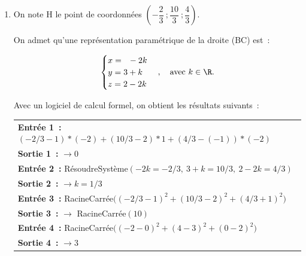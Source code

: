 \begin{enumerate}
\begin{enumerate}[label=\textbf{\alph*.}]
		\item La valeur exacte de la longueur DE, distance du point D au plan (ABC) est: 
		
$\begin{aligned}
\text{DE}
& =\ds\sqrt{\left (x_{\text E} - x_{\text D}\right )^2 + \left (y_{\text E} - y_{\text D}\right )^2 + \left (z_{\text E} - z_{\text D}\right )^2}
 =\ds\sqrt{\left (\frac{11}{2} - 8\right )^2 + \left (-2 - 2\right )^2 + \left (-\frac{21}{2} - (-11)\right )^2}\\
 & = \ds\sqrt{\left (-\frac{5}{2}\right )^2 + \left (-4\right )^2 + \left (\frac{1}{2}\right )^2}
 = \ds\sqrt{\frac{25}{4} + 16 + \frac{1}{4} }
  = \ds\sqrt{\frac{90}{4}}
  = \dfrac{3\sqrt{10}}{2}
\end{aligned}$		
		
		  
	\end{enumerate}
\item On note H le point de coordonnées $\left(-\dfrac{2}{3}~;\dfrac{10}{3}~;\dfrac{4}{3}\right)$.

On admet qu'une représentation paramétrique de la droite (BC) est~:

\[
\begin{cases}
x = \phantom{3}-2k\\
y = 3+k\\
z = 2-2k
\end{cases}, \quad \text{avec } k \in \R.
\]

Avec un logiciel de calcul formel, on obtient les résultats suivants~:

\begin{center}
\begin{tabular}{|p{8.5cm}|}\hline
\textbf{Entrée 1~:} $(-2/3-1)*(-2)+(10/3-2)*1+(4/3-(-1))*(-2)$\\
\textbf{Sortie 1~:} $\rightarrow 0$\\
\hline
\textbf{Entrée 2~:} RésoudreSystème$(-2k=-2/3,\ 3+k=10/3,\ 2-2k=4/3)$\\
\textbf{Sortie 2~:} $\rightarrow k = 1/3$\\
\hline
\textbf{Entrée 3~:} RacineCarrée$\big((-2/3-1)^2+(10/3-2)^2+(4/3+1)^2\big)$\\
\textbf{Sortie 3~:} $\rightarrow$ RacineCarrée$(10)$\\
\hline
\textbf{Entrée 4~:} RacineCarrée$\big((-2-0)^2+(4-3)^2+(0-2)^2\big)$\\
\textbf{Sortie 4~:} $\rightarrow 3$\\
\hline
\end{tabular}
\end{center}


\end{enumerate}
